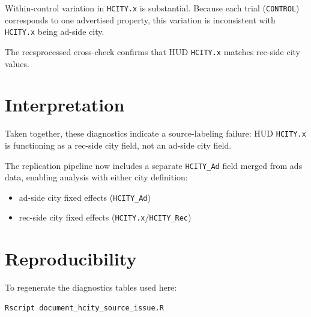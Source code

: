 \documentclass[11pt]{article}
\begin{document}


Within-control variation in \texttt{HCITY.x} is substantial. Because each trial (\texttt{CONTROL}) corresponds to one advertised property, this variation is inconsistent with \texttt{HCITY.x} being ad-side city.



The recsprocessed cross-check confirms that HUD \texttt{HCITY.x} matches rec-side city values.

\section{Interpretation}
Taken together, these diagnostics indicate a source-labeling failure: HUD \texttt{HCITY.x} is functioning as a rec-side city field, not an ad-side city field.

The replication pipeline now includes a separate \texttt{HCITY\_Ad} field merged from ads data, enabling analysis with either city definition:
\begin{itemize}
\item ad-side city fixed effects (\texttt{HCITY\_Ad})
\item rec-side city fixed effects (\texttt{HCITY.x}/\texttt{HCITY\_Rec})
\end{itemize}

\section{Reproducibility}
To regenerate the diagnostics tables used here:
\begin{verbatim}
Rscript document_hcity_source_issue.R
\end{verbatim}
\end{document}
